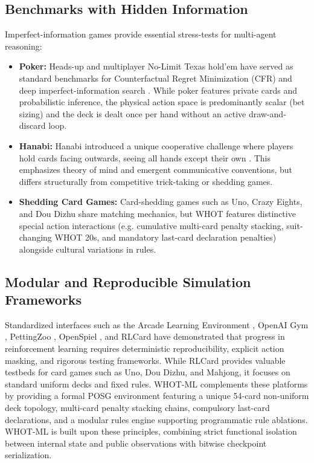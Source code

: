 \documentclass[11pt]{article}
\begin{document}
\subsection{Benchmarks with Hidden Information}
Imperfect-information games provide essential stress-tests for multi-agent reasoning:
\begin{itemize}
  \item \textbf{Poker:} Heads-up and multiplayer No-Limit Texas hold'em have served as standard benchmarks for Counterfactual Regret Minimization (CFR) and deep imperfect-information search \citep{bowling2015heads,moravcik2017deepstack,brown2019superhuman}. While poker features private cards and probabilistic inference, the physical action space is predominantly scalar (bet sizing) and the deck is dealt once per hand without an active draw-and-discard loop.
  \item \textbf{Hanabi:} Hanabi introduced a unique cooperative challenge where players hold cards facing outwards, seeing all hands except their own \citep{bard2020hanabi}. This emphasizes theory of mind and emergent communicative conventions, but differs structurally from competitive trick-taking or shedding games.
  \item \textbf{Shedding Card Games:} Card-shedding games such as Uno, Crazy Eights, and Dou Dizhu \citep{zha2021douzero} share matching mechanics, but WHOT features distinctive special action interactions (e.g. cumulative multi-card penalty stacking, suit-changing WHOT 20s, and mandatory last-card declaration penalties) alongside cultural variations in rules.
\end{itemize}

\subsection{Modular and Reproducible Simulation Frameworks}
Standardized interfaces such as the Arcade Learning Environment \citep{bellemare2013arcade}, OpenAI Gym \citep{brockman2016openai}, PettingZoo \citep{terry2021pettingzoo}, OpenSpiel \citep{lanctot2019openspiel}, and RLCard \citep{zha2020rlcard} have demonstrated that progress in reinforcement learning requires deterministic reproducibility, explicit action masking, and rigorous testing frameworks. While RLCard provides valuable testbeds for card games such as Uno, Dou Dizhu, and Mahjong, it focuses on standard uniform decks and fixed rules. WHOT-ML complements these platforms by providing a formal POSG environment featuring a unique 54-card non-uniform deck topology, multi-card penalty stacking chains, compulsory last-card declarations, and a modular rules engine supporting programmatic rule ablations. WHOT-ML is built upon these principles, combining strict functional isolation between internal state and public observations with bitwise checkpoint serialization.
\end{document}

